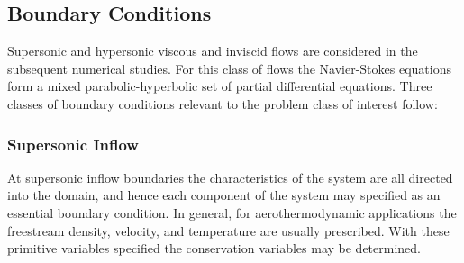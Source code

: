 \subsection{Boundary Conditions\label{sect:comp_ns_bcs}}






Supersonic and hypersonic viscous and inviscid flows are considered in the subsequent numerical studies.  For this class of flows the Navier-Stokes equations form a mixed parabolic-hyperbolic set of partial differential equations.  Three classes of boundary conditions relevant to the problem class of interest follow:

\subsubsection{Supersonic Inflow}
At supersonic inflow boundaries the characteristics of the system are all directed into the domain, and hence each component of the system may specified as an essential boundary condition.  In general, for aerothermodynamic applications the freestream density, velocity, and temperature are usually prescribed. With these primitive variables specified the conservation variables may be determined.


